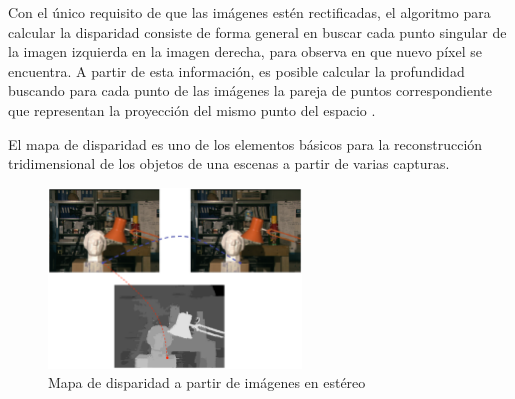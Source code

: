 Con el único requisito de que las imágenes estén rectificadas, el algoritmo para
calcular la disparidad consiste de forma general en buscar cada punto singular
de la imagen izquierda en la imagen derecha, para observa en que nuevo píxel se
encuentra. A partir de esta información, es posible calcular la profundidad
buscando para cada punto de las imágenes la pareja de puntos correspondiente que
representan la proyección del mismo punto del espacio \cite{CalculoDisparidad}.

El mapa de disparidad es uno de los elementos básicos para la reconstrucción
tridimensional de los objetos de una escenas a partir de varias capturas.

\begin{figure}[!th]
  \begin{center}
    \includegraphics[width=0.6\textwidth]{images/cap2/MapaDisparidad.eps}
    \caption{Mapa de disparidad a partir de imágenes en estéreo}
    \label{fig:MapaDisparidad}
  \end{center}
\end{figure}


